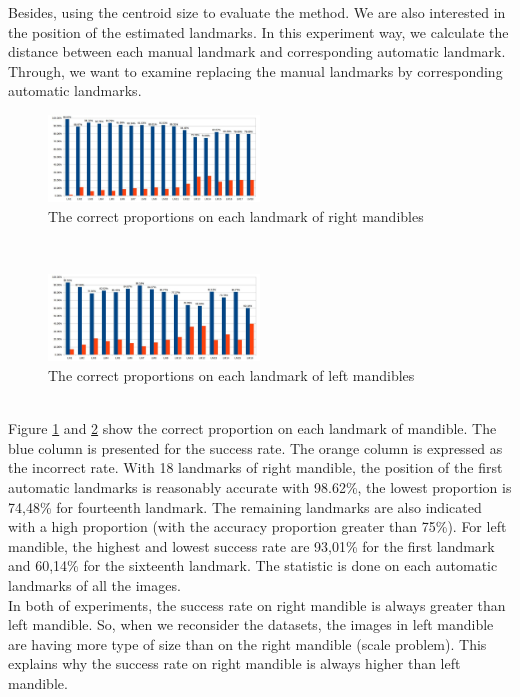 \documentclass[twoside,twocolumn,10pt]{article}
\begin{document}
Besides, using the centroid size to evaluate the method. We are also
interested in the position of the estimated landmarks. In this experiment
way, we calculate the distance between each manual landmark and
corresponding automatic landmark. Through, we want to examine replacing the manual landmarks by corresponding automatic landmarks.
\begin{figure}[htb]
    \centering
    \includegraphics[width=0.5\textwidth]{./images/md_chartlms}
    \caption{The correct proportions on each landmark of right mandibles }
    \label{figmdresultlm}
\end{figure}~\\
\begin{figure}[htb]
    \centering
    \includegraphics[width=0.5\textwidth]{./images/mg_chartlms}
    \caption{The correct proportions on each landmark of left mandibles }
    \label{figmgresultlm}
\end{figure}~\\
Figure \ref{figmdresultlm} and \ref{figmgresultlm} show the correct proportion on each landmark of mandible. The blue column is presented for the success rate. The orange column is expressed as the incorrect rate. With 18 landmarks of right mandible, the position of the first automatic landmarks is reasonably accurate with 98.62\%, the lowest proportion is 74,48\% for fourteenth landmark. The remaining landmarks are also indicated with a high proportion (with the accuracy proportion greater than 75\%). For left mandible, the highest and lowest success rate are 93,01\% for the first landmark and 60,14\% for the sixteenth landmark. The statistic is done on each automatic landmarks of all the images.\\

In both of experiments, the success rate on right mandible is always greater than left mandible. So, when we reconsider the datasets, the images in left mandible are having more type of size than on the right mandible (scale problem). This explains why the success rate on right mandible is always higher than left mandible.\\
\end{document}
